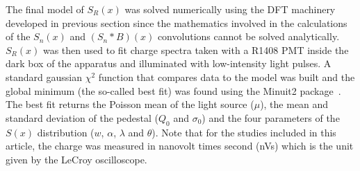 \documentclass[a4paper,11pt]{article}
\begin{document}
The final model of $S_R(x)$ was solved numerically using the DFT machinery developed in previous section
since the mathematics involved in the calculations of the $S_n(x)$ and $(S_n*B)(x)$ convolutions cannot be solved analytically. 
$S_R(x)$ was then used to fit charge spectra taken with a R1408 PMT inside the dark box of the apparatus and illuminated with low-intensity light pulses. %
A standard gaussian $\chi^2$ function that compares data to the model was built and the global minimum (the so-called best fit) was found using the Minuit2 package~\cite{minuit2}. 
The best fit returns the Poisson mean of the light source ($\mu$), the mean and standard deviation of the pedestal ($Q_0$ and $\sigma_0$) and the four parameters of the $S(x)$ distribution ($w$, $\alpha$, $\lambda$ and $\theta$). 
Note that for the studies included in this article, the charge was measured in nanovolt times second (nVs) which is the unit given by the LeCroy oscilloscope. 
\end{document}
